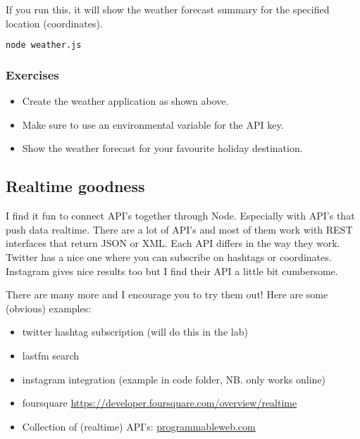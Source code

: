 \documentclass[a4paper]{report}
\begin{document}
 
 
\noindent If you run this, it will show the weather forecast summary for the specified location (coordinates). 
 
\begin{lstlisting}[language=bash] 
node weather.js 
\end{lstlisting} 
 
\subsubsection*{Exercises} 
\begin{itemize} 
	\item Create the weather application as shown above. 
	\item Make sure to use an environmental variable for the API key. 
	\item Show the weather forecast for your favourite holiday destination. 
\end{itemize} 
 
\subsection*{Realtime goodness} 
I find it fun to connect API's together through Node. Especially with API's that push data realtime. There are a lot of API's and most of them work with REST interfaces that return JSON or XML. Each API differs in the way they work. Twitter has a nice one where you can subscribe on hashtags or coordinates. Instagram gives nice results too but I find their API a little bit cumbersome. 
 
There are many more and I encourage you to try them out! Here are some (obvious) examples: 
 
\begin{itemize} 
	\item twitter hashtag subscription (will do this in the lab) 
	\item lastfm search 
	\item instagram integration (example in code folder, NB. only works online) 
	\item foursquare \href{https://developer.foursquare.com/overview/realtime}{https://developer.foursquare.com/overview/realtime} 
	\item Collection of (realtime) API's: \href{http://www.programmableweb.com/}{programmableweb.com} 
\end{itemize} 
 
\end{document}

